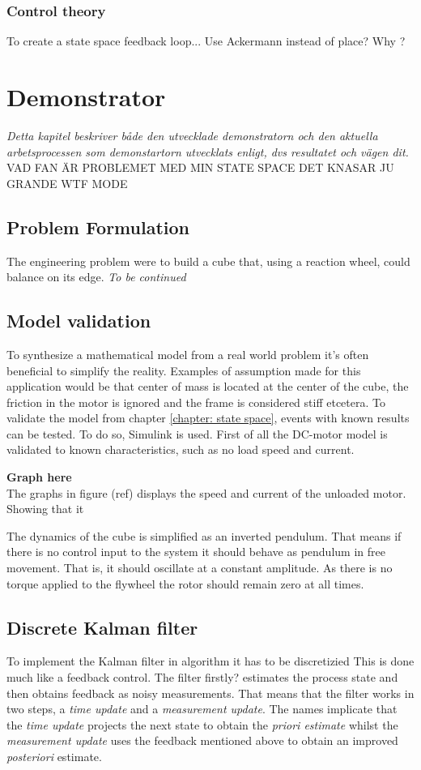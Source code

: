 \documentclass[a4paper,11pt]{kth-mag}
\begin{document}
\subsection{Control theory}
To create a state space feedback loop...
Use Ackermann instead of place? Why ?
 
\chapter{Demonstrator}
\emph{Detta kapitel beskriver både den utvecklade demonstratorn och den aktuella arbetsprocessen som demonstartorn utvecklats enligt, dvs resultatet och vägen dit.}
VAD FAN ÄR PROBLEMET MED MIN STATE SPACE DET KNASAR JU GRANDE WTF MODE

\section{Problem Formulation}

The engineering problem were to build a cube that, using a reaction wheel, could balance on its edge.
\emph{To be continued}


\section{Model validation}
To synthesize a mathematical model from a real world problem it's often beneficial to simplify the reality. Examples of assumption made for this application would be that center of mass is located at the center of the cube, the friction in the motor is ignored and the frame is considered stiff etcetera. 
To validate the model from chapter \ref{chapter: state space}, events with known results can be tested. To do so, Simulink \cite{MATLAB:2014} is used.
First of all the DC-motor model is validated to known characteristics, such as no load speed and current. 

\textbf{Graph here}
\\
The graphs in figure (ref) displays the speed and current of the unloaded motor. Showing that it   

The dynamics of the cube is simplified as an inverted pendulum. That means if there is no control input to the system it should behave as pendulum in free movement. That is, it should oscillate at a constant amplitude. As there is no torque applied to the flywheel the rotor should remain zero at all times. 
\section{Discrete Kalman filter} \label{sec: discrete kalman}
To implement the Kalman filter in algorithm it has to be discretizied 
This is done much like a feedback control. The filter firstly? estimates the process state and then obtains feedback as noisy measurements. That means that the filter works in two steps, a \textit{time update} and a \textit{measurement update}. The names implicate that the \textit{time update} projects the next state to obtain the \textit{priori estimate} whilst the \textit{measurement update} uses the feedback mentioned above to obtain an improved \textit{posteriori} estimate.
\end{document}
